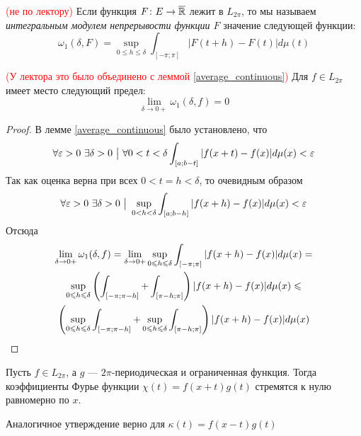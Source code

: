 \begin{definition} \textcolor{red}{(не по лектору)}
	Если функция $F \colon E \to \overline{\mathbb{R}}$ лежит в $L_{2\pi}$, то мы называем \textit{интегральным модулем непрерывости функции $F$} значение следующей функции:
	\[
		\omega_1(\delta, F) = \sup_{0 \le h \le \delta} \int_{[-\pi; \pi]} |F(t + h) - F(t)|d\mu(t)
	\]
\end{definition}

\begin{lemma} \textcolor{red}{(У лектора это было объединено с леммой \ref{average_continuous})}
	Для $f \in L_{2\pi}$ имеет место следующий предел:
	\[
		\lim_{\delta \to 0+} \omega_1(\delta, f) = 0
	\]
\end{lemma}

\begin{proof}
	В лемме \ref{average_continuous} было установлено, что
	\[
		\forall \eps > 0\ \exists \delta > 0 \such \forall 0 < t < \delta \int_{[a; b - t]} |f(x + t) - f(x)|d\mu(x) < \eps
	\]
	Так как оценка верна при всех $0 < t = h < \delta$, то очевидным образом
	\[
		\forall \eps > 0\ \exists \delta > 0 \such \sup_{0 < h < \delta} \int_{[a; b - h]} |f(x + h) - f(x)|d\mu(x) < \eps
	\]
	Отсюда
	\begin{multline*}
		\lim_{\delta \to 0+} \omega_1(\delta, f) = \lim_{\delta \to 0+} \sup_{0 \leqslant h \leqslant \delta} \int_{[-\pi; \pi]} |f(x + h) - f(x)|d\mu(x) =
		\\
		\sup_{0 \leqslant h \leqslant \delta} \left(\int_{[-\pi; \pi - h]} + \int_{[\pi - h; \pi]}\right) |f(x + h) - f(x)|d\mu(x) \leqslant
		\\
		\left(\sup_{0 \leqslant h \leqslant \delta} \int_{[-\pi; \pi - h]} + \sup_{0 \leqslant h \leqslant \delta} \int_{[\pi - h; \pi]}\right) |f(x + h) - f(x)|d\mu(x)
	\end{multline*}
\end{proof}

\begin{lemma} \label{uniconv_lemma}
	Пусть $f \in L_{2\pi}$, а $g$ --- $2\pi$-периодическая и ограниченная функция. Тогда коэффициенты Фурье функции $\chi(t) = f(x + t)g(t)$ стремятся к нулю равномерно по $x$.
\end{lemma}

\begin{note}
	Аналогичное утверждение верно для $\kappa(t) = f(x - t)g(t)$
\end{note}

